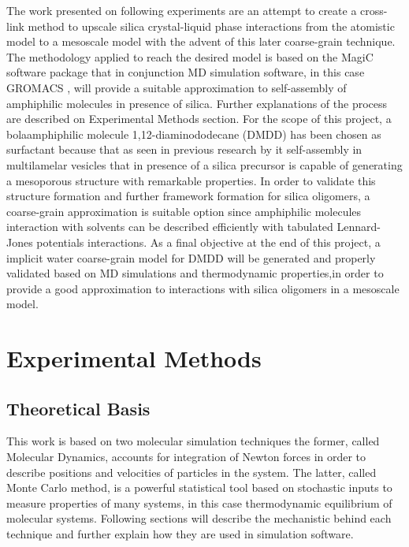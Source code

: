 \documentclass[10pt,a4paper,twoside]{article}
\begin{document}
The work presented on following experiments are an attempt to create a cross-link method to upscale silica crystal-liquid phase interactions \cite{silica1} from the atomistic model to a mesoscale model with the advent of this later coarse-grain technique. The methodology applied to reach the desired model is based on the MagiC software package \cite{magic} that in conjunction MD simulation software, in this case GROMACS \cite{gromacs}, will provide a suitable approximation to self-assembly of amphiphilic molecules in presence of silica. Further explanations of the process are described on Experimental Methods section. For the scope of this project, a bolaamphiphilic molecule 1,12-diaminododecane (DMDD) has been chosen as surfactant because that as seen in previous research by  it self-assembly in multilamelar vesicles that in presence of a silica precursor is capable of generating a mesoporous structure with remarkable properties. In order to validate this structure formation and further framework formation for silica oligomers, a coarse-grain approximation is suitable option since amphiphilic molecules interaction with solvents can be described efficiently with tabulated Lennard-Jones potentials interactions. As a final objective at the end of this project, a implicit water coarse-grain model for DMDD will be generated and properly validated based on MD simulations and thermodynamic properties,in order to provide a good approximation to interactions with silica oligomers in a mesoscale model. 
\section{Experimental Methods}
\subsection{Theoretical Basis}
This work is based on two molecular simulation techniques the former, called Molecular Dynamics, accounts for integration of Newton forces in order to describe positions and velocities of particles in the system. The latter, called Monte Carlo method, is a powerful statistical tool based on stochastic inputs to measure properties of many systems, in this case thermodynamic equilibrium of molecular systems. Following sections will describe the mechanistic behind each technique and further explain how they are used in simulation software.
\end{document}
